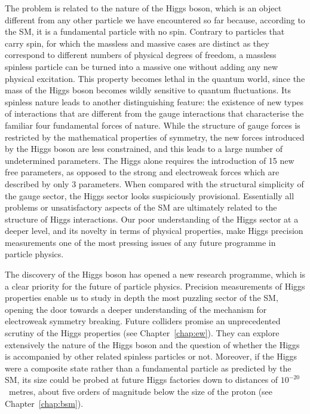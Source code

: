 \documentclass[../report.tex]{subfiles}
\begin{document}
The problem is related to the nature of the Higgs boson, which is an object different from any other particle we have encountered so far because, according to the SM, it is a fundamental particle with no spin. Contrary to particles that carry spin, for which the massless and massive cases are distinct as they correspond to different numbers of physical degrees of freedom, a massless spinless particle can be turned into a massive one without adding any new physical excitation. This property becomes lethal in the quantum world, since the mass of the Higgs boson becomes wildly sensitive to quantum fluctuations. Its spinless nature leads to another distinguishing feature: the existence of new types of interactions that are different from the gauge interactions that characterise the familiar four fundamental forces of nature. While the structure of gauge forces is restricted by the mathematical properties of symmetry, the new forces introduced by the Higgs boson are less constrained, and this leads to a large number of undetermined parameters. The Higgs alone requires the introduction of 15 new free parameters, as opposed to the strong and electroweak forces which are described by only 3 parameters. When compared with the structural simplicity of the gauge sector, the Higgs sector looks suspiciously provisional. Essentially all problems or unsatisfactory aspects of the SM are ultimately related to the structure of Higgs interactions. Our poor understanding of the Higgs sector at a deeper level, and its novelty in terms of physical properties, make Higgs precision measurements one of the most pressing issues of any future programme in particle physics.

The discovery of the Higgs boson has opened a new research programme, which is a clear priority for the future of particle physics. Precision measurements of Higgs properties enable us to study in depth the most puzzling sector of the SM, opening the door towards a deeper understanding of the mechanism for electroweak symmetry breaking. Future colliders promise an unprecedented scrutiny of the Higgs properties (see Chapter~\ref{chap:ew}). They can explore extensively the nature of the Higgs boson and the question of whether the Higgs is accompanied by other related spinless particles or not. Moreover, if the Higgs were a composite state rather than a fundamental particle as predicted by the SM, its size could be probed at future Higgs factories down to distances of $10^{-20}$~metres, about five orders of magnitude below the size of the proton (see Chapter~\ref{chap:bsm}). 
\end{document}
